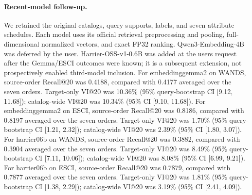 \paragraph{Recent-model follow-up.} We retained the original catalogs, query supports, labels, and seven attribute schedules. Each model uses its official retrieval preprocessing and pooling, full-dimensional normalized vectors, and exact FP32 ranking. Qwen3-Embedding-4B was deferred by the user. Harrier-OSS-v1-0.6B was added at the user\textquotesingle s request after the Gemma/ESCI outcomes were known; it is a subsequent extension, not prospectively enabled third-model inclusion.
For embeddinggemma2 on WANDS, source-order Recall@20 was 0.4188, compared with 0.4177 averaged over the seven orders. Target-only VI@20 was 10.36\% (95\% query-bootstrap CI [9.12, 11.68]); catalog-wide VI@20 was 10.34\% (95\% CI [9.10, 11.68]).
For embeddinggemma2 on ESCI, source-order Recall@20 was 0.8186, compared with 0.8197 averaged over the seven orders. Target-only VI@20 was 1.70\% (95\% query-bootstrap CI [1.21, 2.32]); catalog-wide VI@20 was 2.39\% (95\% CI [1.80, 3.07]).
For harrier06b on WANDS, source-order Recall@20 was 0.3882, compared with 0.3904 averaged over the seven orders. Target-only VI@20 was 8.49\% (95\% query-bootstrap CI [7.11, 10.06]); catalog-wide VI@20 was 8.08\% (95\% CI [6.99, 9.21]).
For harrier06b on ESCI, source-order Recall@20 was 0.7879, compared with 0.7877 averaged over the seven orders. Target-only VI@20 was 1.81\% (95\% query-bootstrap CI [1.38, 2.29]); catalog-wide VI@20 was 3.19\% (95\% CI [2.41, 4.09]).

